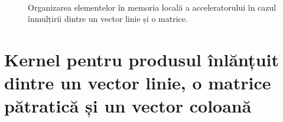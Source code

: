 ~
\begin{figure}[h]\ContinuedFloat
\centering
\captionsetup{justification=centering}
\caption{Organizarea elementelor în memoria locală a acceleratorului în cazul
înmulțirii dintre un vector linie și o matrice.}
\label{fig:chunking-main}
\end{figure}

\section{Kernel pentru produsul înlănțuit dintre un vector linie, o matrice
pătratică și un vector coloană}
\label{sec:kernel-mult-chain}

